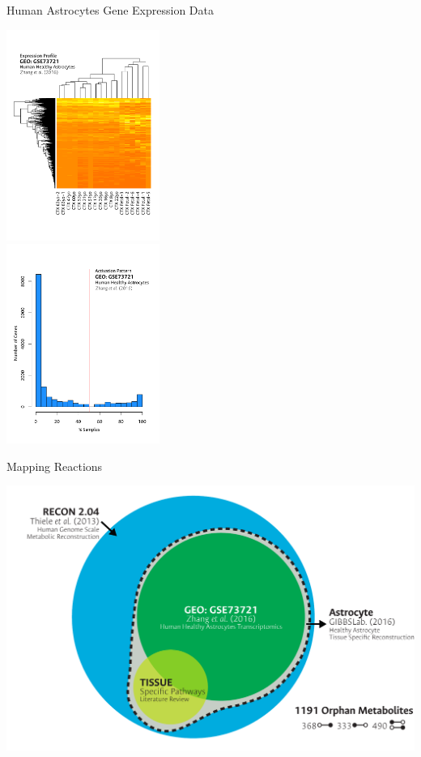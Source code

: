 \documentclass[11pt]{beamer}
\begin{document}
\begin{frame}{Human Astrocytes Gene Expression Data}
\begin{center}
\begin{multicols}{2}
\includegraphics[width=5cm]{GE}\\
\includegraphics[width=5cm]{ActiveGenes}
\end{multicols}
\end{center}
\end{frame}
\begin{frame}{Mapping Reactions}
\begin{center}
\includegraphics[width=\textwidth]{TSR}
\end{center}
\end{frame}
\end{document}
